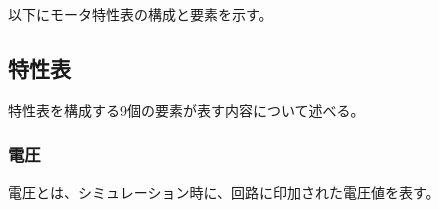 以下にモータ特性表の構成と要素を示す。
\subsection{特性表}\label{sub:tokuseihyou}
特性表を構成する9個の要素が表す内容について述べる。
\subsubsection{電圧}\label{sub:sub:dennatu}
電圧とは、シミュレーション時に、回路に印加された電圧値を表す。

